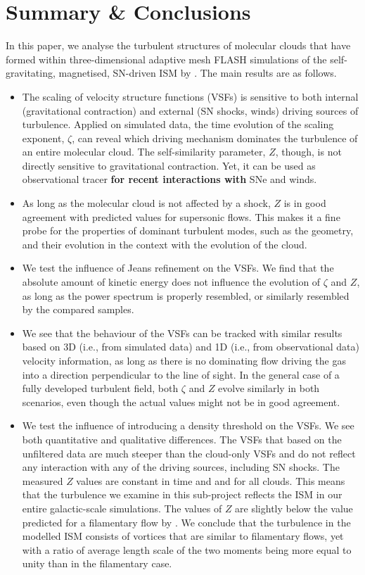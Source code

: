 \section{Summary \& Conclusions}\label{conclusions}

In this paper, we analyse the turbulent structures of molecular clouds that have formed within three-dimensional adaptive mesh FLASH simulations of the self-gravitating, magnetised, SN-driven ISM by \citet{IbanezMejia2016}.
The main results are as follows.

\begin{itemize}
	\item The scaling of velocity structure functions (VSFs) is sensitive to both internal (gravitational contraction) and external (SN shocks, winds) driving sources of turbulence. Applied on simulated data, the time evolution of the scaling exponent, $\zeta$, can reveal which driving mechanism dominates the turbulence of an entire molecular cloud. The self-similarity parameter, $Z$, though, is not directly sensitive to gravitational contraction. Yet, it can be used as observational tracer \textbf{for recent interactions with} SNe and winds.
	\item As long as the molecular cloud is not affected by a shock, $Z$ is in good agreement with predicted values for supersonic flows. This makes it a fine probe for the properties of dominant turbulent modes, such as the geometry, and their evolution in the context with the evolution of the cloud. 
	\item We test the influence of Jeans refinement on the VSFs. We find that the absolute amount of kinetic energy does not influence the evolution of $\zeta$ and $Z$, as long as the power spectrum is properly resembled, or similarly resembled by the compared samples.
	\item We see that the behaviour of the VSFs can be tracked with similar results based on 3D (i.e., from simulated data) and 1D (i.e., from observational data) velocity information, as long as there is no dominating flow driving the gas into a direction perpendicular to the line of sight. In the general case of a fully developed turbulent field, both $\zeta$ and $Z$ evolve similarly in both scenarios, even though the actual values might not be in good agreement.
	\item We test the influence of introducing a density threshold on the VSFs. We see both quantitative and qualitative differences. The VSFs that based on the unfiltered data are much steeper than the cloud-only VSFs and do not reflect any interaction with any of the driving sources, including SN shocks. The measured $Z$ values are constant in time and and for all clouds. This means that the turbulence we examine in this sub-project reflects the ISM in our entire galactic-scale simulations. The values of $Z$ are slightly below the value predicted for a filamentary flow by \citet{She1994}. We conclude that the turbulence in the modelled ISM consists of vortices that are similar to filamentary flows, yet with a ratio of average length scale of the two moments being more equal to unity than in the filamentary case.

\end{itemize}
